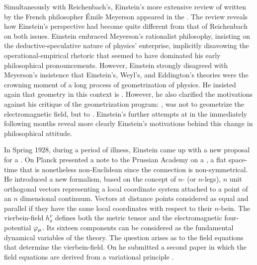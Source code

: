 \documentclass[draft]{article}
\renewcommand{\me}{;~m.e.{}}
\newcommand{\nbein}{$n$-bein\xspace}
\newcommand{\vbein}{vierbein\xspace}
\newcommand{\hbein}{\ensuremath{h_{a}^{\nu}}\xspace}
\begin{document}

Simultaneously with Reichenbach's, Einstein's more extensive review of  written by the French philosopher \'Emile Meyerson \citep{Meyerson1925} appeared in the \citet{Einstein1928b}. The review reveals how Einstein's perspective had become quite different from that of Reichenbach on both issues. Einstein embraced Meyerson's rationalist philosophy, insisting on the deductive-speculative nature of physics' enterprise, implicitly disavowing the operational-empirical rhetoric that seemed to have dominated his early philosophical pronouncements. However, Einstein strongly disagreed with Meyerson's insistence that Einstein's, Weyl's, and Eddington's theories were the crowning moment of a long process of geometrization of physics. He insisted again that geometry in this context is  \citep[165\me]{Einstein1928b}. However, he also clarified the motivations against his critique of the geometrization program: , was not to geometrize the electromagnetic field, but to  \citep[165\me]{Einstein1928b}. Einstein's further attempts at \uft in the immediately following months reveal more clearly Einstein's motivations behind this change in philosophical attitude.


In Spring 1928, during a period of illness, Einstein came up with a new proposal for a \uft. On  Planck presented a note to the Prussian Academy on a  \citep{Einstein19281}, a flat space-time that is nonetheless non-Euclidean since the connection \Gtmn is non-symmetrical. He introduced a new formalism, based on the concept of $n$- (or $n$-legs), $n$ unit orthogonal vectors representing a local coordinate system attached to a point of an $n$ dimensional continuum. Vectors at distance points considered as equal and parallel if they have the same local coordinates with respect to their \nbein. The \vbein-field \hbein defines both the metric tensor \gmn and the electromagnetic four-potential $\varphi_{\mu}$. Its sixteen components can be considered as the fundamental dynamical variables of the theory. The question arises as to the field equations that determine the \vbein-field. On  he submitted a second paper in which the field equations are derived from a variational principle \citep{Einstein19282}.
\end{document}
